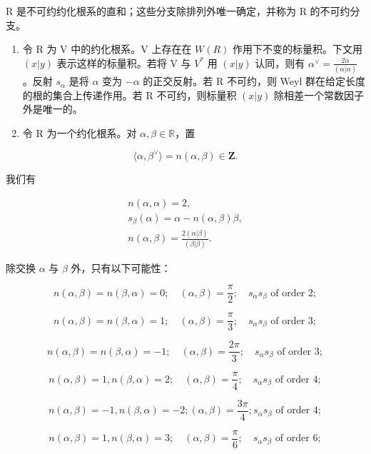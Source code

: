 R 是不可约约化根系的直和；这些分支除排列外唯一确定，并称为 R 的不可约分支。

\begin{enumerate}
\def\labelenumi{\arabic{enumi})}
\setcounter{enumi}{4}
\item
  令 R 为 V 中的约化根系。V 上存在在 \(W(R)\) 作用下不变的标量积。下文用 \((x|y)\) 表示这样的标量积。若将 V 与 \(V^{*}\) 用 \((x|y)\) 认同，则有 \(\alpha^{\vee} = \frac{2\alpha}{(\alpha|\alpha)}\)。反射 \(s_{\alpha}\) 是将 \(\alpha\) 变为 \(-\alpha\) 的正交反射。若 R 不可约，则 Weyl 群在给定长度的根的集合上传递作用。若 R 不可约，则标量积 \((x|y)\) 除相差一个常数因子外是唯一的。
\item
  令 R 为一个约化根系。对 \(\alpha, \beta \in \mathbb{R}\)，置
\end{enumerate}

\[
\langle \alpha , \beta^{\vee} \rangle = n (\alpha , \beta) \in \mathbf {Z}.
\]

我们有

\[
\begin{array}{c} n (\alpha , \alpha) = 2, \\ s _ {\beta} (\alpha) = \alpha - n (\alpha , \beta) \beta , \\ n (\alpha , \beta) = \frac {2 (\alpha | \beta)}{(\beta | \beta)}. \end{array}
\]

除交换 \(\alpha\) 与 \(\beta\) 外，只有以下可能性：

\[
n (\alpha , \beta) = n (\beta , \alpha) = 0; \quad (\alpha , \beta) = \frac {\pi}{2}; \quad s _ {\alpha} s _ {\beta} \text {   of   order   } 2;
\]

\[
n (\alpha , \beta) = n (\beta , \alpha) = 1; \quad (\alpha , \beta) = \frac {\pi}{3}; \quad s _ {\alpha} s _ {\beta} \text {   of   order   } 3;
\]

\[
n (\alpha , \beta) = n (\beta , \alpha) = - 1; \quad (\alpha , \beta) = \frac {2 \pi}{3}; \quad s _ {\alpha} s _ {\beta} \text {   of   order   } 3;
\]

\[
n (\alpha , \beta) = 1, n (\beta , \alpha) = 2; \quad (\alpha , \beta) = \frac {\pi}{4}; \quad s _ {\alpha} s _ {\beta} \text {   of   order   } 4;
\]

\[
n (\alpha , \beta) = - 1, n (\beta , \alpha) = - 2; (\alpha , \beta) = \frac {3 \pi}{4}; s _ {\alpha} s _ {\beta} \text {   of   order   } 4;
\]

\[
n (\alpha , \beta) = 1, n (\beta , \alpha) = 3; \quad (\alpha , \beta) = \frac {\pi}{6}; \quad s _ {\alpha} s _ {\beta} \text {   of   order   } 6;
\]

